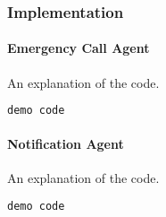 \subsubsection{Implementation}

\paragraph{Emergency Call Agent}

An explanation of the code.
\begin{lstlisting}[language=Python]
demo code
\end{lstlisting}

\paragraph{Notification Agent}
An explanation of the code.

\begin{lstlisting}[language=Python]
demo code
\end{lstlisting}
